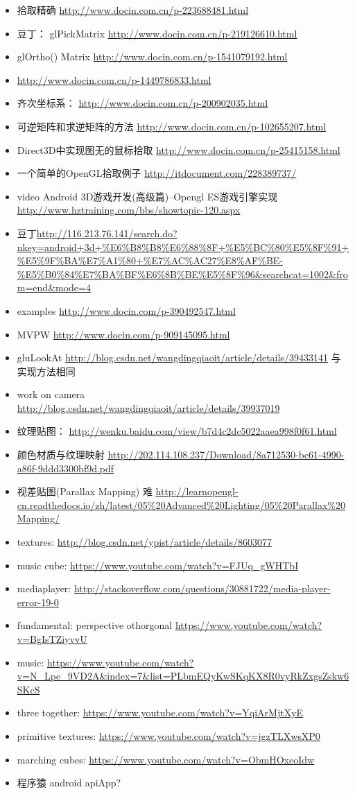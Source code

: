 \documentclass[9pt,b5paper]{article}
\begin{document}
\begin{itemize}
\item 拾取精确 \url{http://www.docin.com.cn/p-223688481.html}
\item 豆丁： glPickMatrix \url{http://www.docin.com.cn/p-219126610.html}
\item glOrtho() Matrix \url{http://www.docin.com.cn/p-1541079192.html}
\item \url{http://www.docin.com.cn/p-1449786833.html}
\item 齐次坐标系： \url{http://www.docin.com.cn/p-200902035.html}
\item 可逆矩阵和求逆矩阵的方法 \url{http://www.docin.com.cn/p-102655207.html}
\item Direct3D中实现图无的鼠标拾取 \url{http://www.docin.com.cn/p-25415158.html}
\item 一个简单的OpenGL拾取例子 \url{http://itdocument.com/228389737/}
\item video Android 3D游戏开发(高级篇)--Opengl ES游戏引擎实现 \url{http://www.hztraining.com/bbs/showtopic-120.aspx}
\item 豆丁\url{http://116.213.76.141/search.do?nkey=android+3d+\%E6\%B8\%B8\%E6\%88\%8F+\%E5\%BC\%80\%E5\%8F\%91+\%E5\%9F\%BA\%E7\%A1\%80+\%E7\%AC\%AC27\%E8\%AF\%BE-\%E5\%B0\%84\%E7\%BA\%BF\%E6\%8B\%BE\%E5\%8F\%96&searchcat=1002&from=end&mode=4}
\item examples \url{http://www.docin.com/p-390492547.html}
\item MVPW \url{http://www.docin.com/p-909145095.html}
\item gluLookAt \url{http://blog.csdn.net/wangdingqiaoit/article/details/39433141} 与实现方法相同
\item work on camera \url{http://blog.csdn.net/wangdingqiaoit/article/details/39937019}
\item 纹理贴图： \url{http://wenku.baidu.com/view/b7d4c2dc5022aaea998f0f61.html}
\item 颜色材质与纹理映射 \url{http://202.114.108.237/Download/8a712530-bc61-4990-a86f-9ddd3300bf9d.pdf}
\item 视差贴图(Parallax Mapping) 难 \url{http://learnopengl-cn.readthedocs.io/zh/latest/05\%20Advanced\%20Lighting/05\%20Parallax\%20Mapping/}
\item textures: \url{http://blog.csdn.net/ypist/article/details/8603077}
\item music cube: \url{https://www.youtube.com/watch?v=FJUq_gWHTbI}
\item mediaplayer: \url{http://stackoverflow.com/questions/30881722/media-player-error-19-0}
\item fundamental: perspective othorgonal \url{https://www.youtube.com/watch?v=BgIsTZiyvvU}
\item music: \url{https://www.youtube.com/watch?v=N_Lpe_9VD2A&index=7&list=PLbmEQyKwSKqKX8R0vyRkZxgsZskw6SKcS}
\item three together: \url{https://www.youtube.com/watch?v=YqiArMjtXyE}
\item primitive textures: \url{https://www.youtube.com/watch?v=jgzTLXwsXP0}
\item marching cubes: \url{https://www.youtube.com/watch?v=ObmHOxeoIdw}
\item 程序猿 android apiApp?
\end{itemize}
\end{document}
